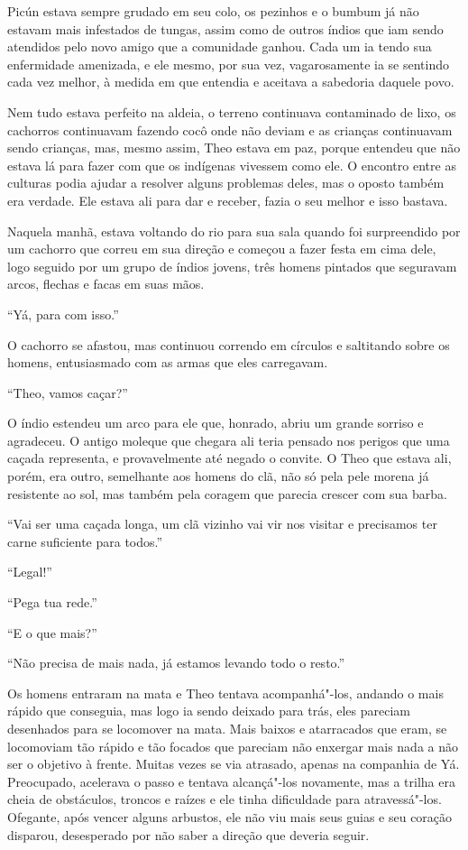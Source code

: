 Picún estava sempre grudado em seu colo, os pezinhos e o bumbum já não
estavam mais infestados de tungas, assim como de outros índios que iam
sendo atendidos pelo novo amigo que a comunidade ganhou. Cada um ia
tendo sua enfermidade amenizada, e ele mesmo, por sua vez, vagarosamente
ia se sentindo cada vez melhor, à medida em que entendia e aceitava a
sabedoria daquele povo.

Nem tudo estava perfeito na aldeia, o terreno continuava contaminado de
lixo, os cachorros continuavam fazendo cocô onde não deviam e as
crianças continuavam sendo crianças, mas, mesmo assim, Theo estava em
paz, porque entendeu que não estava lá para fazer com que os indígenas
vivessem como ele. O encontro entre as culturas podia ajudar a resolver
alguns problemas deles, mas o oposto também era verdade. Ele estava ali
para dar e receber, fazia o seu melhor e isso bastava.

Naquela manhã, estava voltando do rio para sua sala quando foi
surpreendido por um cachorro que correu em sua direção e começou a fazer
festa em cima dele, logo seguido por um grupo de índios jovens, três
homens pintados que seguravam arcos, flechas e facas em suas mãos.

``Yá, para com isso.''

O cachorro se afastou, mas continuou correndo em círculos e saltitando
sobre os homens, entusiasmado com as armas que eles carregavam.

``Theo, vamos caçar?''

O índio estendeu um arco para ele que, honrado, abriu um grande sorriso
e agradeceu. O antigo moleque que chegara ali teria pensado nos perigos
que uma caçada representa, e provavelmente até negado o convite. O Theo
que estava ali, porém, era outro, semelhante aos homens do clã, não só
pela pele morena já resistente ao sol, mas também pela coragem que
parecia crescer com sua barba.

``Vai ser uma caçada longa, um clã vizinho vai vir nos visitar e
precisamos ter carne suficiente para todos.''

``Legal!''

``Pega tua rede.''

``E o que mais?''

``Não precisa de mais nada, já estamos levando todo o resto.''

Os homens entraram na mata e Theo tentava acompanhá"-los, andando o mais
rápido que conseguia, mas logo ia sendo deixado para trás, eles
pareciam desenhados para se locomover na mata. Mais baixos e atarracados
que eram, se locomoviam tão rápido e tão focados que pareciam não
enxergar mais nada a não ser o objetivo à frente. Muitas vezes se via
atrasado, apenas na companhia de Yá. Preocupado, acelerava o passo e
tentava alcançá"-los novamente, mas a trilha era cheia de obstáculos,
troncos e raízes e ele tinha dificuldade para atravessá"-los. Ofegante,
após vencer alguns arbustos, ele não viu mais seus guias e seu coração
disparou, desesperado por não saber a direção que deveria seguir.

